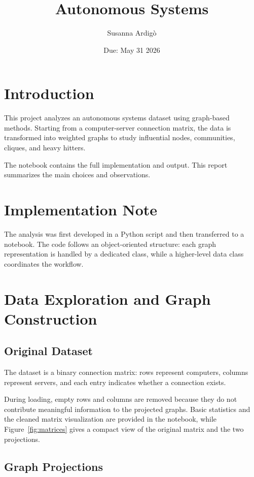 \documentclass[11pt,a4paper]{article}
\title{Autonomous Systems}
\author{Susanna Ardig\`o}
\date{Due: May 31 2026}
\begin{document}
\maketitle

\section{Introduction}

This project analyzes an autonomous systems dataset using graph-based methods. Starting from a computer-server connection matrix, the data is transformed into weighted graphs to study influential nodes, communities, cliques, and heavy hitters.

The notebook contains the full implementation and output. This report summarizes the main choices and observations.

\section{Implementation Note}

The analysis was first developed in a Python script and then transferred to a notebook. The code follows an object-oriented structure: each graph representation is handled by a dedicated class, while a higher-level data class coordinates the workflow.

\section{Data Exploration and Graph Construction}

\subsection{Original Dataset}

The dataset is a binary connection matrix: rows represent computers, columns represent servers, and each entry indicates whether a connection exists.

During loading, empty rows and columns are removed because they do not contribute meaningful information to the projected graphs. Basic statistics and the cleaned matrix visualization are provided in the notebook, while Figure~\ref{fig:matrices} gives a compact view of the original matrix and the two projections.

\subsection{Graph Projections}
\end{document}
